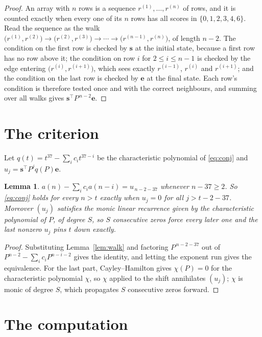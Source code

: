 \documentclass[11pt,a4paper]{article}
\theoremstyle{plain}
\newtheorem{lemma}[theorem]{Lemma}
\theoremstyle{definition}
\begin{document}
\begin{proof}
An array with $n$ rows is a sequence $r^{(1)},\dots,r^{(n)}$ of rows, and it is counted
exactly when every one of its $n$ rows has all scores in $\{0,1,2,3,4,6\}$. Read the sequence as the
walk $\bigl(r^{(1)},r^{(2)}\bigr)\to\bigl(r^{(2)},r^{(3)}\bigr)\to\cdots\to
\bigl(r^{(n-1)},r^{(n)}\bigr)$, of length $n-2$. The condition on the first row is
checked by $\mathbf{s}$ at the initial state, because a first row has no row above it; the
condition on row $i$ for $2\le i\le n-1$ is checked by the edge entering
$\bigl(r^{(i)},r^{(i+1)}\bigr)$, which sees exactly $r^{(i-1)}$, $r^{(i)}$ and
$r^{(i+1)}$; and the condition on the last row is checked by $\mathbf{e}$ at the final
state. Each row's condition is therefore tested once and with the correct neighbours, and
summing over all walks gives $\mathbf{s}^{\!\top}P^{\,n-2}\mathbf{e}$.
\end{proof}

\section{The criterion}

Let $q(t)=t^{37}-\sum_i c_i t^{37-i}$ be the characteristic polynomial of
\eqref{eq:conj} and $u_j=\mathbf{s}^{\!\top}P^{j}q(P)\mathbf{e}$.

\begin{lemma}\label{lem:crit}
$a(n)-\sum_i c_i a(n-i)=u_{\,n-2-37}$ whenever $n-37\ge2$. So \eqref{eq:conj}
holds for every $n>t$ exactly when $u_j=0$ for all $j>t-2-37$. Moreover $(u_j)$
satisfies the monic linear recurrence given by the characteristic polynomial of $P$, of
degree $S$, so $S$ consecutive zeros force every later one and the last nonzero $u_j$ pins
$t$ down exactly.
\end{lemma}

\begin{proof}
Substituting Lemma~\ref{lem:walk} and factoring $P^{\,n-2-37}$ out of
$P^{n-2}-\sum_i c_i P^{n-i-2}$ gives the identity, and letting the exponent run gives the
equivalence. For the last part, Cayley--Hamilton gives $\chi(P)=0$ for the characteristic
polynomial $\chi$, so $\chi$ applied to the shift annihilates $(u_j)$; $\chi$ is monic of
degree $S$, which propagates $S$ consecutive zeros forward.
\end{proof}

\section{The computation}
\end{document}
